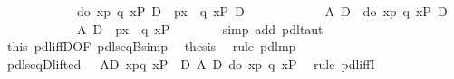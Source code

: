 \begin{isabellebody}
\ \ \isamarkupfalse%
\ {\isacharminus}\isanewline
\ \ \ \ \isamarkupfalse%
\ {\isachardoublequote}{\isasymturnstile}\ {\isacharparenleft}{\isacharbrackleft}{\isacharhash}\ do\ {\isacharbraceleft}x{\isasymleftarrow}p{\isacharsemicolon}\ q\ x{\isacharbraceright}{\isacharbrackright}P\ {\isasymlongrightarrow}\isactrlsub D\ {\isacharbrackleft}{\isacharhash}\ p{\isacharbrackright}{\isacharparenleft}{\isasymlambda}x{\isachardot}\ {\isacharbrackleft}{\isacharhash}\ q\ x{\isacharbrackright}P{\isacharparenright}{\isacharparenright}\ {\isasymlongrightarrow}\isactrlsub D\isanewline
\ \ \ \ \ \ \ \ \ \ \ \ {\isacharparenleft}A\ {\isasymlongrightarrow}\isactrlsub D\ {\isacharbrackleft}{\isacharhash}\ do\ {\isacharbraceleft}x{\isasymleftarrow}p{\isacharsemicolon}\ q\ x{\isacharbraceright}{\isacharbrackright}P{\isacharparenright}\ {\isasymlongrightarrow}\isactrlsub D\isanewline
\ \ \ \ \ \ \ \ \ \ \ \ {\isacharparenleft}A\ {\isasymlongrightarrow}\isactrlsub D\ {\isacharbrackleft}{\isacharhash}\ p{\isacharbrackright}{\isacharparenleft}{\isasymlambda}x{\isachardot}\ {\isacharbrackleft}{\isacharhash}\ q\ x{\isacharbrackright}P{\isacharparenright}{\isacharparenright}{\isachardoublequote}\isanewline
\ \ \ \ \ \ \isamarkupfalse%
\ {\isacharparenleft}simp\ add{\isacharcolon}\ pdl{\isacharunderscore}taut{\isacharparenright}\isanewline
\ \ \ \ \isamarkupfalse%
\ this\ pdl{\isacharunderscore}iffD{}{\isacharbrackleft}OF\ pdl{\isacharunderscore}seqB{\isacharunderscore}simp{\isacharbrackright}\ \isamarkupfalse%
\ {\isacharquery}thesis\ \isamarkupfalse%
\ {\isacharparenleft}rule\ pdl{\isacharunderscore}mp{\isacharparenright}\isanewline
\ \ \isamarkupfalse%
\isanewline
\isamarkupfalse%
\isanewline
\isanewline
\isamarkupfalse%
\ pdl{\isacharunderscore}seqD{\isacharunderscore}lifted{}{\isacharcolon}\ {\isachardoublequote}{\isasymturnstile}\ {\isacharparenleft}\ A{\isasymlongrightarrow}\isactrlsub D\ {\isasymlangle}x{\isasymleftarrow}p{\isasymrangle}{\isasymlangle}q\ x{\isasymrangle}P\ {\isacharparenright}\ {\isasymlongleftrightarrow}\isactrlsub D\ {\isacharparenleft}A\ {\isasymlongrightarrow}\isactrlsub D\ {\isasymlangle}do\ {\isacharbraceleft}x{\isasymleftarrow}p{\isacharsemicolon}\ q\ x{\isacharbraceright}{\isasymrangle}P\ {\isacharparenright}{\isachardoublequote}\isanewline
\isamarkupfalse%
\ {\isacharparenleft}rule\ pdl{\isacharunderscore}iffI{\isacharparenright}\isanewline
\ \ \isamarkupfalse%

\end{isabellebody}
